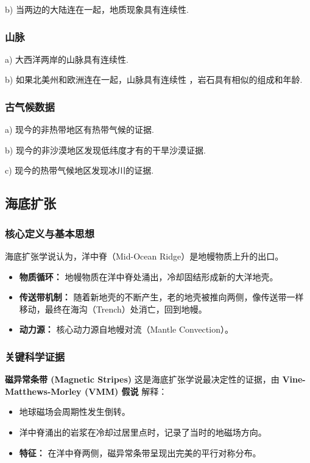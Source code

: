 \documentclass[12pt,a4paper]{article}
\begin{document}
	b) 当两边的大陆连在一起，地质现象具有连续性.
	
	\subsubsection{山脉}
	a) 大西洋两岸的山脉具有连续性.
	
	b) 如果北美州和欧洲连在一起，山脉具有连续性 ，岩石具有相似的组成和年龄.
	
	\subsubsection{古气候数据}
	a) 现今的非热带地区有热带气候的证据.
	
	b) 现今的非沙漠地区发现低纬度才有的干旱沙漠证据.
	
	c) 现今的热带气候地区发现冰川的证据.
	
	\subsection{海底扩张}
	
	\subsubsection{核心定义与基本思想}
	海底扩张学说认为，洋中脊（Mid-Ocean Ridge）是地幔物质上升的出口。
	\begin{itemize}
		\item \textbf{物质循环：} 地幔物质在洋中脊处涌出，冷却固结形成新的大洋地壳。
		\item \textbf{传送带机制：} 随着新地壳的不断产生，老的地壳被推向两侧，像传送带一样移动，最终在海沟（Trench）处消亡，回到地幔。
		\item \textbf{动力源：} 核心动力源自地幔对流（Mantle Convection）。
	\end{itemize}
	
	\subsubsection{关键科学证据}
	
	\textbf{磁异常条带 (Magnetic Stripes)}
	这是海底扩张学说最决定性的证据，由 \textbf{Vine-Matthews-Morley (VMM) 假说} 解释：
	\begin{itemize}
		\item 地球磁场会周期性发生倒转。
		\item 洋中脊涌出的岩浆在冷却过居里点时，记录了当时的地磁场方向。
		\item \textbf{特征：} 在洋中脊两侧，磁异常条带呈现出完美的平行对称分布。
	\end{itemize}
	
\end{document}
